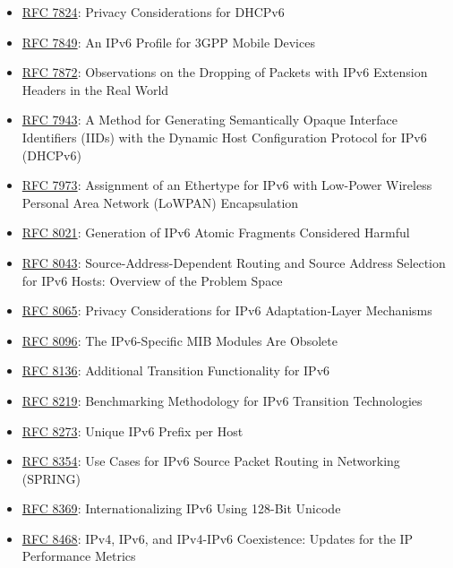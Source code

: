 \documentclass[
]{article}
\begin{document}
\begin{itemize}
\item
  \href{https://www.rfc-editor.org/info/rfc7824}{RFC 7824}: Privacy
  Considerations for DHCPv6
\item
  \href{https://www.rfc-editor.org/info/rfc7849}{RFC 7849}: An IPv6
  Profile for 3GPP Mobile Devices
\item
  \href{https://www.rfc-editor.org/info/rfc7872}{RFC 7872}: Observations
  on the Dropping of Packets with IPv6 Extension Headers in the Real
  World
\item
  \href{https://www.rfc-editor.org/info/rfc7943}{RFC 7943}: A Method for
  Generating Semantically Opaque Interface Identifiers (IIDs) with the
  Dynamic Host Configuration Protocol for IPv6 (DHCPv6)
\item
  \href{https://www.rfc-editor.org/info/rfc7973}{RFC 7973}: Assignment
  of an Ethertype for IPv6 with Low-Power Wireless Personal Area Network
  (LoWPAN) Encapsulation
\item
  \href{https://www.rfc-editor.org/info/rfc8021}{RFC 8021}: Generation
  of IPv6 Atomic Fragments Considered Harmful
\item
  \href{https://www.rfc-editor.org/info/rfc8043}{RFC 8043}:
  Source-Address-Dependent Routing and Source Address Selection for IPv6
  Hosts: Overview of the Problem Space
\item
  \href{https://www.rfc-editor.org/info/rfc8065}{RFC 8065}: Privacy
  Considerations for IPv6 Adaptation-Layer Mechanisms
\item
  \href{https://www.rfc-editor.org/info/rfc8096}{RFC 8096}: The
  IPv6-Specific MIB Modules Are Obsolete
\item
  \href{https://www.rfc-editor.org/info/rfc8136}{RFC 8136}: Additional
  Transition Functionality for IPv6
\item
  \href{https://www.rfc-editor.org/info/rfc8219}{RFC 8219}: Benchmarking
  Methodology for IPv6 Transition Technologies
\item
  \href{https://www.rfc-editor.org/info/rfc8273}{RFC 8273}: Unique IPv6
  Prefix per Host
\item
  \href{https://www.rfc-editor.org/info/rfc8354}{RFC 8354}: Use Cases
  for IPv6 Source Packet Routing in Networking (SPRING)
\item
  \href{https://www.rfc-editor.org/info/rfc8369}{RFC 8369}:
  Internationalizing IPv6 Using 128-Bit Unicode
\item
  \href{https://www.rfc-editor.org/info/rfc8468}{RFC 8468}: IPv4, IPv6,
  and IPv4-IPv6 Coexistence: Updates for the IP Performance Metrics

\end{itemize}
\end{document}
